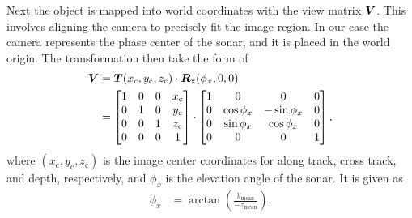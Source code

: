 Next the object is mapped into world coordinates with the view matrix $\boldsymbol{V}$. This involves aligning the camera to precisely fit the image region. In our case the camera represents the phase center of the sonar, and it is placed in the world origin. The transformation then take the form of
%
\begin{align}
\boldsymbol{V} &= \boldsymbol{T}(x_\text{c}, y_\text{c}, z_\text{c}) \cdot \boldsymbol{R}_\text{x}(\phi_x, 0, 0) \nonumber\\
&= 
\begin{bmatrix}
1  &  0  &  0  &  x_\text{c} \\
0  &  1  &  0  &  y_\text{c} \\
0  &  0  &  1  &  z_\text{c} \\
0  &  0  &  0  &  1 \\
\end{bmatrix} \cdot
\begin{bmatrix}
1  &  0           &  0           &  0 \\
0  &  \cos\phi_x  &  -\sin\phi_x &  0 \\
0  &  \sin\phi_x  &  \cos\phi_x  &  0 \\
0  &  0           &  0           &  1 \\
\end{bmatrix},
\end{align}
%
where $(x_\text{c}, y_\text{c}, z_\text{c})$ is the image center coordinates for along track, cross track, and depth, respectively, and $\phi_x$ is the elevation angle of the sonar. It is given as
%
\begin{align*}
\phi_x &= \arctan\left(\frac{y_\text{mean}}{-z_\text{mean}}\right).
\end{align*}

